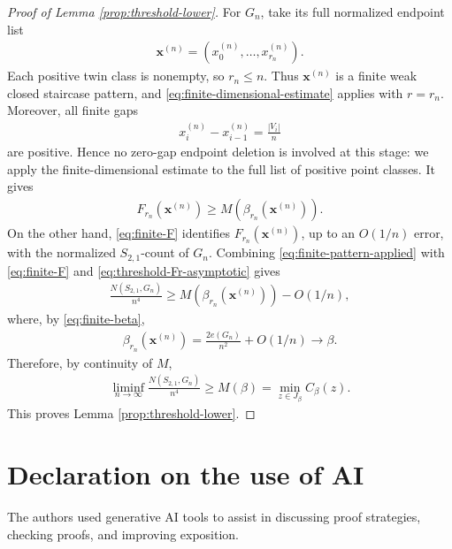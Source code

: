 \documentclass[10pt,a4paper]{article}
\begin{document}
\begin{proof}[Proof of Lemma \ref{prop:threshold-lower}]
For $G_n$, take its full normalized endpoint list
\begin{align*}
  \mathbf{x}^{(n)}=(x_0^{(n)},\ldots,x_{r_n}^{(n)}).
\end{align*}
Each positive twin class is nonempty, so $r_n\le n$.  Thus
$\mathbf{x}^{(n)}$ is a finite weak closed staircase pattern, and
\eqref{eq:finite-dimensional-estimate} applies with $r=r_n$.  Moreover,
all finite gaps
\begin{align*}
  x_i^{(n)}-x_{i-1}^{(n)}=\frac{|V_i|}{n}
\end{align*}
are positive.  Hence no zero-gap endpoint deletion is involved at this stage:
we apply the finite-dimensional estimate to the full list of positive point
classes.  It gives
\begin{align}\label{eq:finite-pattern-applied}
  F_{r_n}(\mathbf{x}^{(n)})
  \ge M(\beta_{r_n}(\mathbf{x}^{(n)})).
\end{align}
On the other hand, \eqref{eq:finite-F} identifies
$F_{r_n}(\mathbf{x}^{(n)})$, up to an $O(1/n)$ error, with the normalized
$S_{2,1}$-count of $G_n$.  Combining \eqref{eq:finite-pattern-applied} with \eqref{eq:finite-F} and \eqref{eq:threshold-Fr-asymptotic} gives
\begin{align*}
  \frac{N(S_{2,1},G_n)}{n^4}
  \ge M(\beta_{r_n}(\mathbf{x}^{(n)}))-O(1/n),
\end{align*}
where, by \eqref{eq:finite-beta},
\begin{align*}
  \beta_{r_n}(\mathbf{x}^{(n)})=\frac{2e(G_n)}{n^2}+O(1/n)\to\beta.
\end{align*}
Therefore, by continuity of $M$,
\begin{align*}
  \liminf_{n\to\infty}\frac{N(S_{2,1},G_n)}{n^4}
  \ge M(\beta)=\min_{z\in J_\beta}C_\beta(z).
\end{align*}
This proves Lemma \ref{prop:threshold-lower}.
\end{proof}





\section*{Declaration on the use of AI}
%
The authors used generative AI tools to assist in discussing proof strategies, checking proofs, and improving exposition.



\end{document}
